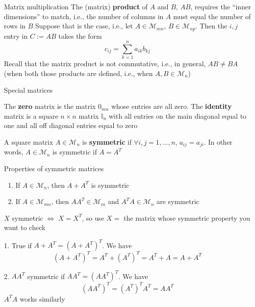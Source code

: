 \documentclass{beamer}
\def\II{\mathbb{I}}
\def\M{\mathcal{M}}
\begin{document}
\begin{frame}{Matrix multiplication}
The (matrix) \textbf{product} of $A$ and $B$, $AB$, requires the ``inner dimensions'' to match, i.e., the number of columns in $A$ must equal the number of rows in $B$
\vfill
Suppose that is the case, i.e., let $A\in\M_{mn}$, $B\in\M_{np}$. Then the $i,j$ entry in $C:=AB$ takes the form
\[
c_{ij} = \sum_{k=1}^n a_{ik}b_{kj}
\]
\vfill
Recall that the matrix product is not commutative, i.e., in general, $AB\neq BA$ (when both those products are defined, i.e., when $A,B\in\M_n$)
\end{frame}

\begin{frame}{Special matrices}
\begin{definition}
The \textbf{zero} matrix is the matrix $0_{mn}$ whose entries are all zero.
The \textbf{identity} matrix is a square $n\times n$ matrix $\II_n$ with all entries on the main diagonal equal to one and all off diagonal entries equal to zero
\end{definition}
\begin{definition}
A square matrix $A\in\M_n$ is \textbf{symmetric} if $\forall i,j=1,\ldots,n$, $a_{ij}=a_{ji}$. In other words, $A\in\M_n$ is symmetric if $A=A^T$
\end{definition}
\end{frame}


\begin{frame}{Properties of symmetric matrices}
\begin{theorem}
\begin{enumerate}
	\item If $A\in\M_n$, then $A+A^T$ is symmetric
	\item If $A\in\M_{mn}$, then $AA^T\in\M_m$ and $A^TA\in\M_n$ are symmetric
\end{enumerate}
\end{theorem}
\vfill
$X$ symmetric $\iff$ $X=X^T$, so use $X=$ the matrix whose symmetric property you want to check

1. True if $A+A^T=(A+A^T)^T$. We have 
\[
(A+A^T)^T=A^T+(A^T)^T=A^T+A=A+A^T
\]

2. $AA^T$ symmetric if $AA^T=(AA^T)^T$. We have 
\[
(AA^T)^T=(A^T)^TA^T=AA^T
\]
$A^TA$ works similarly
\end{frame}
\end{document}
